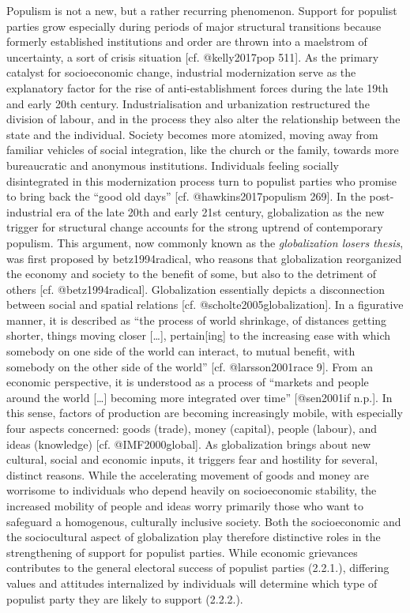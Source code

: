 \documentclass[]{article}
\begin{document}
Populism is not a new, but a rather recurring phenomenon. Support for
populist parties grow especially during periods of major structural
transitions because formerly established institutions and order are
thrown into a maelstrom of uncertainty, a sort of crisis situation
{[}cf. @kelly2017pop 511{]}. As the primary catalyst for socioeconomic
change, industrial modernization serve as the explanatory factor for the
rise of anti-establishment forces during the late 19th and early 20th
century. Industrialisation and urbanization restructured the division of
labour, and in the process they also alter the relationship between the
state and the individual. Society becomes more atomized, moving away
from familiar vehicles of social integration, like the church or the
family, towards more bureaucratic and anonymous institutions.
Individuals feeling socially disintegrated in this modernization process
turn to populist parties who promise to bring back the ``good old days''
{[}cf. @hawkins2017populism 269{]}. In the post-industrial era of the
late 20th and early 21st century, globalization as the new trigger for
structural change accounts for the strong uptrend of contemporary
populism. This argument, now commonly known as the \emph{globalization
losers thesis}, was first proposed by betz1994radical, who reasons that
globalization reorganized the economy and society to the benefit of
some, but also to the detriment of others {[}cf. @betz1994radical{]}.
Globalization essentially depicts a disconnection between social and
spatial relations {[}cf. @scholte2005globalization{]}. In a figurative
manner, it is described as ``the process of world shrinkage, of
distances getting shorter, things moving closer {[}\ldots{}{]},
pertain{[}ing{]} to the increasing ease with which somebody on one side
of the world can interact, to mutual benefit, with somebody on the other
side of the world'' {[}cf. @larsson2001race 9{]}. From an economic
perspective, it is understood as a process of ``markets and people
around the world {[}\ldots{}{]} becoming more integrated over time''
{[}@sen2001if n.p.{]}. In this sense, factors of production are becoming
increasingly mobile, with especially four aspects concerned: goods
(trade), money (capital), people (labour), and ideas (knowledge) {[}cf.
@IMF2000global{]}. As globalization brings about new cultural, social
and economic inputs, it triggers fear and hostility for several,
distinct reasons. While the accelerating movement of goods and money are
worrisome to individuals who depend heavily on socioeconomic stability,
the increased mobility of people and ideas worry primarily those who
want to safeguard a homogenous, culturally inclusive society. Both the
socioeconomic and the sociocultural aspect of globalization play
therefore distinctive roles in the strengthening of support for populist
parties. While economic grievances contributes to the general electoral
success of populist parties (2.2.1.), differing values and attitudes
internalized by individuals will determine which type of populist party
they are likely to support (2.2.2.).
\end{document}

